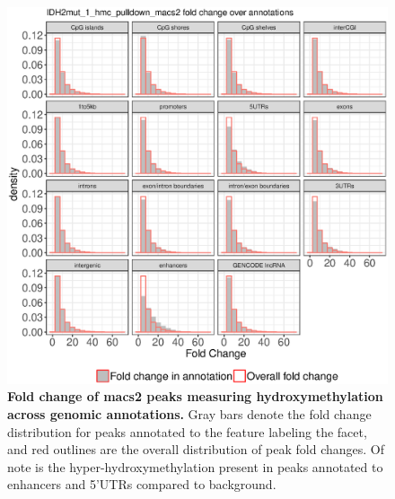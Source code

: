 \begin{figure}[ht!]
\centering
\includegraphics[width=1\textwidth]{chap5figs/figure5_5.eps}
\caption[Fold change of macs2 peaks measuring hydroxymethylation across genomic annotations.]
{
\textbf{Fold change of macs2 peaks measuring hydroxymethylation across genomic annotations.} Gray bars denote the fold change distribution for peaks annotated to the feature labeling the facet, and red outlines are the overall distribution of peak fold changes. Of note is the hyper-hydroxymethylation present in peaks annotated to enhancers and 5'UTRs compared to background.
}
\label{chap5:fig:5}
\end{figure}

\newpage

